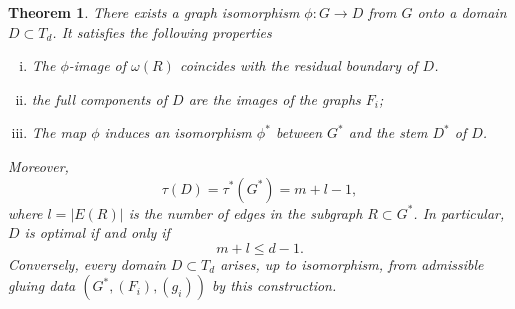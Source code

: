 \documentclass[a4paper, 11pt]{article}
\numberwithin{equation}{section}
\newtheorem{theorem}{Theorem}[section]
\theoremstyle{definition}
\theoremstyle{remark}
\begin{document}
\medskip

\begin{theorem} \label{th.reconstruction}
There exists a graph isomorphism $\phi : G \to D$ from $G$ onto a domain $D\subset T_d$.
It satisfies the following properties 
\begin{enumerate}[(i)]
\item The $\phi$-image of $\omega(R)$ coincides with the residual boundary of $D$.
\item the full components of $D$ are the images of the graphs $F_i$;
\item The map $\phi$ induces an isomorphism $\phi^*$ between $G^*$ and the stem $D^*$ of $D$.
\end{enumerate}
Moreover,
\[
\tau(D)=\tau^*(G^*)=m+l-1,
\]
where $l=|E(R)|$ is the number of edges in the subgraph $R\subset G^*$. In particular, $D$ is optimal if and only if
\[
 m+l\le d-1.
\]
Conversely, every domain $D\subset T_d$ arises, up to isomorphism, from admissible gluing data $(G^*,(F_i),(g_i))$ by this construction.
\end{theorem}
\end{document}
